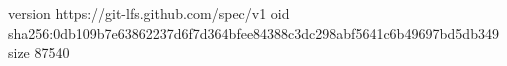 version https://git-lfs.github.com/spec/v1
oid sha256:0db109b7e63862237d6f7d364bfee84388c3dc298abf5641c6b49697bd5db349
size 87540
